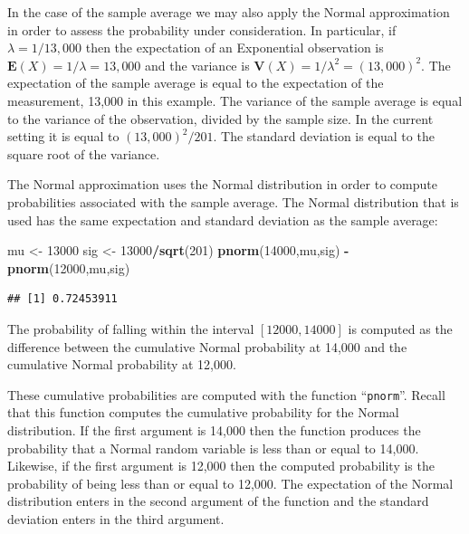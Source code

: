 \documentclass[]{krantz}
\makeatletter
\newenvironment{Shaded}{\begin{snugshade}}{\end{snugshade}}
\newcommand{\DecValTok}[1]{\textcolor[rgb]{0.00,0.00,0.81}{#1}}
\newcommand{\KeywordTok}[1]{\textcolor[rgb]{0.13,0.29,0.53}{\textbf{#1}}}
\newcommand{\NormalTok}[1]{#1}
\newcommand{\OperatorTok}[1]{\textcolor[rgb]{0.81,0.36,0.00}{\textbf{#1}}}
\newcommand{\StringTok}[1]{\textcolor[rgb]{0.31,0.60,0.02}{#1}}
\newcommand{\Expec}{\mathbf{E}}
\newcommand{\Var}{\mathbf{V}}
\newenvironment{kframe}{%
\medskip{}
\setlength{\fboxsep}{.8em}
 \def\at@end@of@kframe{}%
 \ifinner\ifhmode%
  \def\at@end@of@kframe{\end{minipage}}%
  \begin{minipage}{\columnwidth}%
 \fi\fi%
 \def\FrameCommand##1{\hskip\@totalleftmargin \hskip-\fboxsep
 \colorbox{shadecolor}{##1}\hskip-\fboxsep
     \hskip-\linewidth \hskip-\@totalleftmargin \hskip\columnwidth}%
 \MakeFramed {\advance\hsize-\width
   \@totalleftmargin\z@ \linewidth\hsize
   \@setminipage}}%
 {\par\unskip\endMakeFramed%
 \at@end@of@kframe}
\renewenvironment{Shaded}{\begin{kframe}}{\end{kframe}}
\theoremstyle{definition}
\theoremstyle{definition}
\theoremstyle{definition}
\theoremstyle{remark}
\makeatother
\begin{document}
In the case of the sample average we may also apply the Normal
approximation in order to assess the probability under consideration. In
particular, if \(\lambda = 1/13,000\) then the expectation of an
Exponential observation is \(\Expec(X) = 1/\lambda = 13,000\) and the
variance is \(\Var(X) = 1/\lambda^2 = (13,000)^2\). The expectation of the
sample average is equal to the expectation of the measurement, 13,000 in
this example. The variance of the sample average is equal to the
variance of the observation, divided by the sample size. In the current
setting it is equal to \((13,000)^2/201\). The standard deviation is equal
to the square root of the variance.

The Normal approximation uses the Normal distribution in order to
compute probabilities associated with the sample average. The Normal
distribution that is used has the same expectation and standard
deviation as the sample average:

\begin{Shaded}
\begin{Highlighting}[]
\NormalTok{mu <-}\StringTok{ }\DecValTok{13000}
\NormalTok{sig <-}\StringTok{ }\DecValTok{13000}\OperatorTok{/}\KeywordTok{sqrt}\NormalTok{(}\DecValTok{201}\NormalTok{)}
\KeywordTok{pnorm}\NormalTok{(}\DecValTok{14000}\NormalTok{,mu,sig) }\OperatorTok{-}\StringTok{ }\KeywordTok{pnorm}\NormalTok{(}\DecValTok{12000}\NormalTok{,mu,sig)}
\end{Highlighting}
\end{Shaded}

\begin{verbatim}
## [1] 0.72453911
\end{verbatim}

The probability of falling within the interval \([12000, 14000]\) is
computed as the difference between the cumulative Normal probability at
14,000 and the cumulative Normal probability at 12,000.

These cumulative probabilities are computed with the function ``\texttt{pnorm}''.
Recall that this function computes the cumulative probability for the
Normal distribution. If the first argument is 14,000 then the function
produces the probability that a Normal random variable is less than or
equal to 14,000. Likewise, if the first argument is 12,000 then the
computed probability is the probability of being less than or equal to
12,000. The expectation of the Normal distribution enters in the second
argument of the function and the standard deviation enters in the third
argument.
\end{document}
